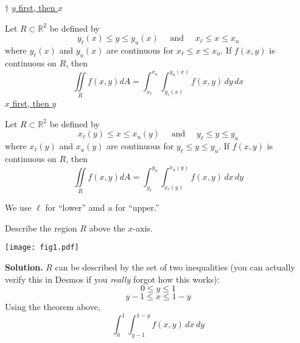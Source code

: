 \begin{Theorem}{$ \dagger $}{}
    \underline{$ y $ first, then $ x $}

    Let $ R\subset \mathbb{R}^2 $ be defined by
    \[ y_\ell(x)\leqslant y\leqslant y_u(x)\quad\text{ and }\quad
        x_{\ell}\leqslant x\leqslant x_u \]
    where $ y_{\ell}(x) $ and $ y_u(x) $ are continuous
    for $ x_{\ell}\leqslant x\leqslant x_u $. If $ f(x,y) $
    is continuous on $ R $, then
    \[ \iint\limits_{R}f(x,y)dA=
        \int_{x_\ell}^{x_u} \int_{y_\ell(x)}^{y_u(x)} f(x,y)\, d{y} \, d{x}  \]
    \underline{$ x $ first, then $ y $}

    Let $ R\subset \mathbb{R}^2 $ be defined by
    \[ x_\ell(y)\leqslant x\leqslant x_u(y)\quad\text{ and }\quad
        y_{\ell}\leqslant y\leqslant y_u \]
    where $ x_{\ell}(y) $ and $ x_u(y) $ are continuous
    for $ y_{\ell}\leqslant y\leqslant y_u $. If $ f(x,y) $
    is continuous on $ R $, then
    \[ \iint\limits_{R}f(x,y)dA=
        \int_{y_\ell}^{y_u} \int_{x_\ell(y)}^{x_u(y)} f(x,y)\, d{x} \, d{y}  \]
\end{Theorem}
We use $ \ell $ for ``lower'' amd $ u $ for ``upper.''
\begin{Example}{}{}
    Describe the region $ R $ above the $ x $-axis.
    \begin{center}
        \texttt{[image: fig1.pdf]}
    \end{center}
    \textbf{Solution.} $ R $ can be described by the set of two inequalities
    (you can actually verify this in Desmos if you \emph{really} forgot how this works):
    \[ 0\leqslant y\leqslant 1 \]
    \[ y-1\leqslant x\leqslant 1-y \]
    Using the theorem above,
    \[ \int_{0}^{1} \int_{y-1}^{1-y} f(x,y)\, d{x}\, d{y}  \]
\end{Example}
